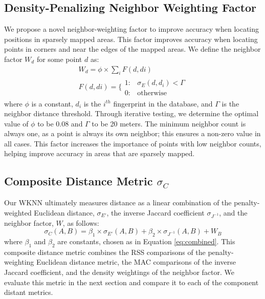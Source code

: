 \documentclass[conference]{IEEEtran}
\begin{document}
\subsection{Density-Penalizing Neighbor Weighting Factor}\label{subsec:density_penalizing_neighbor_weighting}
\indent We propose a novel neighbor-weighting factor to improve accuracy when locating positions in sparsely mapped areas. This factor improves accuracy when locating points in corners and near the edges of the mapped areas. We define the neighbor factor $W_d$ for some point $d$ as:
\begin{equation}
\label{eq:density}
\begin{split}
W_d=\phi\times\sum\limits_{i}F(d,di)\\
F(d,di)=\{\begin{array}{lr}
       1: &  \sigma_E(d, d_i) < \Gamma \\
       0: &  \text{otherwise}
\end{array}
\end{split}
\end{equation}
where $\phi$ is a constant, $d_i$ is the $i^{th}$ fingerprint in the database, and $\Gamma$ is the neighbor distance threshold. Through iterative testing, we determine the optimal value of $\phi$ to be 0.08 and $\Gamma$ to be 20 meters. The minimum neighbor count is always one, as a point is always its own neighbor; this ensures a non-zero value in all cases. This factor increases the importance of points with low neighbor counts, helping improve accuracy in areas that are sparsely mapped. 

\subsection{Composite Distance Metric $\sigma_C$}
\label{subsec:composite_distance_metric}
\indent Our WKNN ultimately measures distance as a linear combination of the penalty-weighted Euclidean distance, $\sigma_{E'}$,  the inverse Jaccard coefficient $\sigma_{J^{-1}}$, and the neighbor factor, $W$, as follows:
\begin{equation}
\label{eq:composite}
\sigma_C(A, B)=\beta_1\times\sigma_{E'}(A, B)+\beta_2\times\sigma_{J^{-1}}(A, B)+W_B
\end{equation}
where $\beta_1$ and $\beta_2$ are constants, chosen as in Equation \ref{eq:combined}. This composite distance metric combines the RSS comparisons of the penalty-weighting Euclidean distance metric, the MAC comparisons of the inverse Jaccard coefficient, and the density weightings of the neighbor factor. We evaluate this metric in the next section and compare it to each of the component distant metrics.
\end{document}
